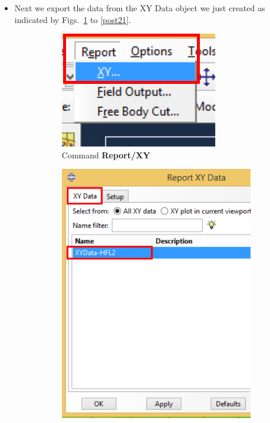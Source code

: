 \begin{itemize}
\item Next we export the data from the XY Data object we just created
  as indicated by Figs.~\ref{post19} to \ref{post21}.
  \begin{figure}[!h]
    \centering
    \begin{subfigure}[!h]{0.25\textwidth}
      \includegraphics[width=\textwidth]{./body/images/post19.pdf}
      \caption{Command \textbf{Report/XY}}
      \label{post19}
    \end{subfigure}%
    \begin{subfigure}[!h]{0.37\textwidth}
      \includegraphics[width=\textwidth]{./body/images/post20.pdf}

\end{subfigure}
\end{figure}
\end{itemize}
